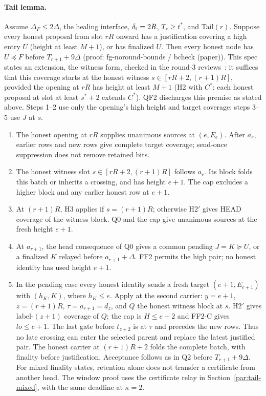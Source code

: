 \documentclass{article}
\theoremstyle{plain}
\theoremstyle{definition}
\theoremstyle{remark}
\begin{document}
\paragraph{Tail lemma.}\label{par:tail}
Assume $\Delta_F\leq2\Delta$, the healing interface, $\delta_{\rm t}=2R$,
$T_r\geq t^*$, and Tail$(r)$.  Suppose every honest proposal from slot $rR$ onward
has a justification covering a high entry $U$ (height at least $M+1$),
or has finalized $U$.  Then every honest node has $U\preceq F$
before $T_{r+1}+9\Delta$ (proof: fg-noround-bounds / bcheck (paper)).
This spec states an extension, the witness form, checked in the round-3
reviews~\cite{NRS3A,NRS3O}: it suffices that this coverage starts
at the honest witness $s\in[rR+2,(r+1)R]$, provided the opening at $rR$
has height at least $M+1$ (H2 with $C^*$: each honest proposal at slot
at least $s^*+2$ extends $C^*$).  QF2 discharges this premise as stated above.
Steps 1--2 use only the opening's high height and target coverage;
steps 3--5 use $J$ at $s$.
\begin{enumerate}[nosep]
\item The honest opening at $rR$ supplies unanimous sources at
  $(e,E_e)$.  After $a_r$, earlier rows and new rows give complete
  target coverage; send-once suppression does not remove retained bits.
\item The honest witness slot $s\in[rR+2,(r+1)R]$ follows $a_r$.
  Its block folds this batch or inherits a crossing, and has height
  $e+1$.  The cap excludes a higher block and any earlier honest row
  at $e+1$.
\item At $(r+1)R$, H3 applies if $s=(r+1)R$; otherwise H2$'$ gives
  HEAD coverage of the witness block.  Q0 and the cap give unanimous
  sources at the fresh height $e+1$.
\item At $a_{r+1}$, the head consequence of Q0 gives a common pending
  $J=K\succeq U$, or a finalized $K$ relayed before $a_{r+1}+\Delta$.
  FF2 permits the high pair; no honest identity has used height $e+1$.
\item In the pending case every honest identity sends a fresh target
  $(e+1,E_{e+1})$ with $(h_K,K)$, where $h_K\leq e$.
  Apply  at the second carrier:
  $y=e+1$, $z=(r+1)R$, $\tau=a_{r+1}=d_z$, and $Q$ the honest
  witness block at $s$.  H2$'$ gives label-$(z+1)$ coverage of $Q$;
  the cap is $H\leq e+2$ and FF2-C gives $\mathit{lo}\leq e+1$.
  The last gate before $t_{z+2}$ is at $\tau$ and precedes the new rows.
  Thus no late crossing can enter the selected parent and replace the
  latest justified pair.  The honest carrier at $(r+1)R+2$ folds the complete
  batch, with finality before justification.  Acceptance follows as in
  Q2 before $T_{r+1}+9\Delta$.  For mixed finality states, retention
  alone does not transfer a certificate from another head.  The window
  proof uses the certificate relay in
  Section~\ref{par:tail-mixed}, with the same deadline at $\kappa=2$.
\end{enumerate}
\end{document}
